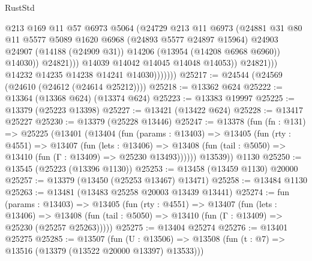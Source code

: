 \begin{lexlean}{RustStd}
\begin{coremodule}
                                  @213
                                  @169
                                  @11
                                  @57
                                  @6973
                                  @5064
                                  (@24729
                                    @213
                                    @11
                                    @6973
                                    (@24881
                                      @31
                                      @80
                                      @11
                                      @5577
                                      @5089
                                      @1620
                                      @6968
                                      (@24893 @5577 @24897 @15964)
                                      @24903
                                      @24907
                                      (@14188 (@24909 @31))
                                      @14206
                                      (@13954 (@14208 @6968 @6960))
                                      @14030))
                                  @24821)))
                            @14039
                            @14042
                            @14045
                            @14048
                            @14053))
                        @24821)))
                  @14232
                  @14235
                  @14238
                  @14241
                  @14030)))))))
@25217 := @24544 (@24569 (@24610 (@24612 (@24614 @25212))))
@25218 := @13362 @624
@25222 := @13364 (@13368 @624) (@13374 @624)
@25223 := @13383 @19997
@25225 := @13379 (@25223 @13398)
@25227 := @13421 (@13422 @624)
@25228 := @13417 @25227
@25230 := @13379 (@25228 @13446)
@25247 := @13378
    (fun (fn : @131) =>
    @25225
      (@13401
        (@13404
          (fun (params : @13403) =>
          @13405
            (fun (rty : @4551) =>
            @13407
              (fun (lets : @13406) =>
              @13408 (fun (tail : @5050) => @13410 (fun (Γ : @13409) => @25230 @13493))))))
        @13539))
    @1130
@25250 := @13545 (@25223 (@13396 @1130))
@25253 := @13458 (@13459 @1130) @20000
@25257 := @13379 (@13450 (@25253 @13467) @13471)
@25258 := @13484 @1130
@25263 := @13481 (@13483 @25258 @20003 @13439 @13441)
@25274 := fun (params : @13403) =>
  @13405
    (fun (rty : @4551) =>
    @13407
      (fun (lets : @13406) =>
      @13408 (fun (tail : @5050) => @13410 (fun (Γ : @13409) => @25230 (@25257 @25263)))))
@25275 := @13404 @25274
@25276 := @13401 @25275
@25285 := @13507
    (fun (U : @13506) => @13508 (fun (t : @7) => @13516 (@13379 (@13522 @20000 @13397) @13533)))

\end{coremodule}
\end{lexlean}
